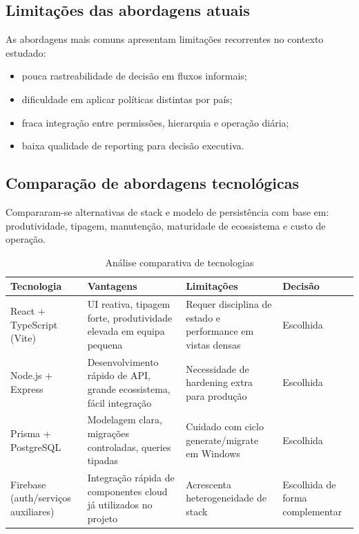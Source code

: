 \documentclass[11pt,a4paper]{article}
\begin{document}
\subsection{Limitações das abordagens atuais}
As abordagens mais comuns apresentam limitações recorrentes no contexto estudado:

\begin{itemize}
  \item pouca rastreabilidade de decisão em fluxos informais;
  \item dificuldade em aplicar políticas distintas por país;
  \item fraca integração entre permissões, hierarquia e operação diária;
  \item baixa qualidade de reporting para decisão executiva.
\end{itemize}

\subsection{Comparação de abordagens tecnológicas}
Compararam-se alternativas de stack e modelo de persistência com base em: produtividade, tipagem, manutenção, maturidade de ecossistema e custo de operação.

\begin{table}[h]
\centering
\begin{tabularx}{\linewidth}{p{3.1cm} Y Y Y}
\toprule
\textbf{Tecnologia} & \textbf{Vantagens} & \textbf{Limitações} & \textbf{Decisão} \\
\midrule
React + TypeScript (Vite) & UI reativa, tipagem forte, produtividade elevada em equipa pequena & Requer disciplina de estado e performance em vistas densas & Escolhida \\
Node.js + Express & Desenvolvimento rápido de API, grande ecossistema, fácil integração & Necessidade de hardening extra para produção & Escolhida \\
Prisma + PostgreSQL & Modelagem clara, migrações controladas, queries tipadas & Cuidado com ciclo generate/migrate em Windows & Escolhida \\
Firebase (auth/serviços auxiliares) & Integração rápida de componentes cloud já utilizados no projeto & Acrescenta heterogeneidade de stack & Escolhida de forma complementar \\
\bottomrule
\end{tabularx}
\caption{Análise comparativa de tecnologias}
\label{tab:tecnologias}
\end{table}
\end{document}
